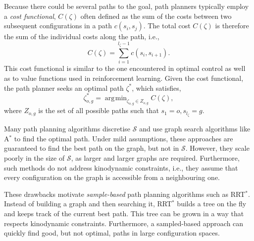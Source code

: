 \documentclass[a4paper,11pt]{report}
\DeclareMathOperator*{\argmin}{\arg\!\min}
\begin{document}
Because there could be several paths to the goal, path planners typically employ a \emph{cost functional}, $C(\zeta)$ often defined as the sum of the costs between two subsequent configurations in a path $c(s_i,s_j)$. The total cost $C(\zeta)$ is therefore the sum of the individual costs along the path, i.e.,
\begin{equation}
	C(\zeta) = \sum_{i=1}^{l_{\zeta}-1} c(s_i,s_{i+1}).
\end{equation}
This cost functional is similar to the one encountered in optimal control as well as to value functions used in reinforcement learning. Given the cost functional, the path planner seeks an optimal path $\zeta^*$, which satisfies,
\begin{equation}
 	\zeta^*_{o,g} = \argmin_{\zeta_{o,g} \in Z_{o,g}} C(\zeta), \label{eq:back_plan}
\end{equation}
where $Z_{o,g}$ is the set of all possible paths such that $s_1 = o, s_{l_\zeta} = g$.

Many path planning algorithms discretise $\mathcal{S}$ and use graph search algorithms like A$^*$ to find the optimal path. Under mild assumptions, these approaches are guaranteed to find the best path on the graph, but not in $\mathcal{S}$. However, they scale poorly in the size of $\mathcal{S}$, as larger and larger graphs are required. Furthermore, such methods do not address kinodynamic constraints, i.e., they assume that every configuration on the graph is accessible from a neighbouring one. 

These drawbacks motivate \emph{sample-based} path planning algorithms such as RRT$^*$. Instead of building a graph and then searching it, RRT$^*$ builds a tree on the fly and keeps track of the current best path. This tree can be grown in a way that respects kinodynamic constraints. Furthermore, a sampled-based approach can quickly find good, but not optimal, paths in large configuration spaces.


\end{document}
